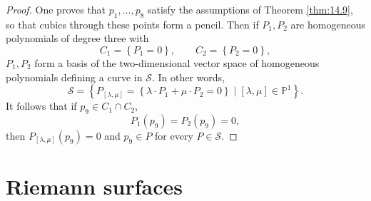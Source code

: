 \documentclass{article}
\renewcommand{\P}{\mathbb{P}}
\renewcommand{\S}{\mathcal{S}}
\newcommand{\rb}[1]{\left( #1 \right)}
\renewcommand{\sb}[1]{\left[ #1 \right]}
\newcommand{\cb}[1]{\left\{ #1 \right\}}
\theoremstyle{definition}\newtheorem{definition}{Definition}[section]
\theoremstyle{definition}\newtheorem{notation}[definition]{Notation}
\theoremstyle{definition}\newtheorem{remark}[definition]{Remark}
\theoremstyle{definition}\newtheorem{example1}[definition]{Example}
\theoremstyle{definition}\newtheorem{fact}{Fact}
\theoremstyle{definition}\newtheorem{exercise}{Exercise}
\theoremstyle{definition}\newtheorem*{example2}{Example}
\begin{document}
\begin{proof}
One proves that $ p_1, \dots, p_8 $ satisfy the assumptions of Theorem \ref{thm:14.9}, so that cubics through these points form a pencil. Then if $ P_1, P_2 $ are homogeneous polynomials of degree three with
$$ C_1 = \cb{P_1 = 0}, \qquad C_2 = \cb{P_2 = 0}, $$
$ P_1, P_2 $ form a basis of the two-dimensional vector space of homogeneous polynomials defining a curve in $ \S $. In other words,
$$ \S = \cb{P_{\sb{\lambda, \mu}} = \cb{\lambda \cdot P_1 + \mu \cdot P_2 = 0} \mid \sb{\lambda, \mu} \in \P^1}. $$
It follows that if $ p_9 \in C_1 \cap C_2 $,
$$ P_1\rb{p_9} = P_2\rb{p_9} = 0, $$
then $ P_{\sb{\lambda, \mu}}\rb{p_9} = 0 $ and $ p_9 \in P $ for every $ P \in \S $.
\end{proof}

\pagebreak

\section{Riemann surfaces}
\end{document}
